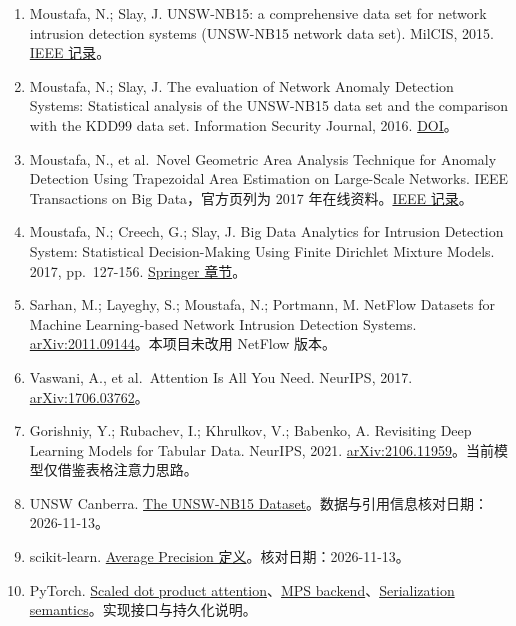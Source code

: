 \documentclass[UTF8,a4paper,11pt,fontset=fandol]{ctexart}
\providecommand{\tightlist}{\setlength{\itemsep}{2pt}\setlength{\parskip}{0pt}}
\begin{document}
\begin{enumerate}
\def\labelenumi{\arabic{enumi}.}
\tightlist
\item
  Moustafa, N.; Slay, J. UNSW-NB15: a comprehensive data set for network
  intrusion detection systems (UNSW-NB15 network data set). MilCIS,
  2015.
  \href{https://ieeexplore.ieee.org/abstract/document/7348942}{IEEE
  记录}。
\item
  Moustafa, N.; Slay, J. The evaluation of Network Anomaly Detection
  Systems: Statistical analysis of the UNSW-NB15 data set and the
  comparison with the KDD99 data set. Information Security Journal,
  2016. \href{https://doi.org/10.1080/19393555.2015.1125974}{DOI}。
\item
  Moustafa, N., et al.~Novel Geometric Area Analysis Technique for
  Anomaly Detection Using Trapezoidal Area Estimation on Large-Scale
  Networks. IEEE Transactions on Big Data，官方页列为 2017
  年在线资料。\href{https://ieeexplore.ieee.org/abstract/document/7948715}{IEEE
  记录}。
\item
  Moustafa, N.; Creech, G.; Slay, J. Big Data Analytics for Intrusion
  Detection System: Statistical Decision-Making Using Finite Dirichlet
  Mixture Models. 2017, pp.~127-156.
  \href{https://link.springer.com/chapter/10.1007/978-3-319-59439-2_5}{Springer
  章节}。
\item
  Sarhan, M.; Layeghy, S.; Moustafa, N.; Portmann, M. NetFlow Datasets
  for Machine Learning-based Network Intrusion Detection Systems.
  \href{https://arxiv.org/abs/2011.09144}{arXiv:2011.09144}。本项目未改用
  NetFlow 版本。
\item
  Vaswani, A., et al.~Attention Is All You Need. NeurIPS, 2017.
  \href{https://arxiv.org/abs/1706.03762}{arXiv:1706.03762}。
\item
  Gorishniy, Y.; Rubachev, I.; Khrulkov, V.; Babenko, A. Revisiting Deep
  Learning Models for Tabular Data. NeurIPS, 2021.
  \href{https://arxiv.org/abs/2106.11959}{arXiv:2106.11959}。当前模型仅借鉴表格注意力思路。
\item
  UNSW Canberra.
  \href{https://research.unsw.edu.au/projects/unsw-nb15-dataset}{The
  UNSW-NB15 Dataset}。数据与引用信息核对日期：2026-11-13。
\item
  scikit-learn.
  \href{https://scikit-learn.org/stable/modules/generated/sklearn.metrics.average_precision_score.html}{Average
  Precision 定义}。核对日期：2026-11-13。
\item
  PyTorch.
  \href{https://docs.pytorch.org/docs/2.15/generated/torch.nn.functional.scaled_dot_product_attention.html}{Scaled
  dot product
  attention}、\href{https://docs.pytorch.org/docs/2.15/notes/mps.html}{MPS
  backend}、\href{https://docs.pytorch.org/docs/2.15/notes/serialization.html}{Serialization
  semantics}。实现接口与持久化说明。
\end{enumerate}
\end{document}
